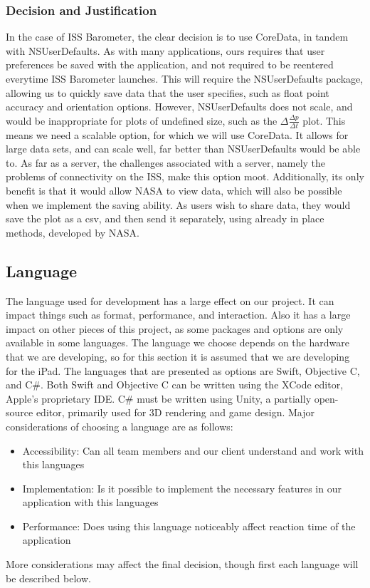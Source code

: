 \documentclass[onecolumn, draftclsnofoot,10pt, compsoc]{IEEEtran}
\begin{document}
\subsubsection{Decision and Justification}
In the case of ISS Barometer, the clear decision is to use CoreData, in tandem with NSUserDefaults.
As with many applications, ours requires that user preferences be saved with the application, and not required to be reentered everytime ISS Barometer launches.
This will require the NSUserDefaults package, allowing us to quickly save data that the user specifies, such as float point accuracy and orientation options.
However, NSUserDefaults does not scale, and would be inappropriate for plots of undefined size, such as the $\Delta \frac{\Delta p}{\Delta t}$ plot.
This means we need a scalable option, for which we will use CoreData.
It allows for large data sets, and can scale well, far better than NSUserDefaults would be able to.
As far as a server, the challenges associated with a server, namely the problems of connectivity on the ISS, make this option moot.
Additionally, its only benefit is that it would allow NASA to view data, which will also be possible when we implement the saving ability.
As users wish to share data, they would save the plot as a csv, and then send it separately, using already in place methods, developed by NASA.

\subsection{Language}
The language used for development has a large effect on our project.
It can impact things such as format, performance, and interaction.
Also it has a large impact on other pieces of this project, as some packages and options are only available in some languages.
The language we choose depends on the hardware that we are developing, so for this section it is assumed that we are developing for the iPad.
The languages that are presented as options are Swift, Objective C, and C\#.
Both Swift and Objective C can be written using the XCode editor, Apple's proprietary IDE.
C\# must be written using Unity, a partially open-source editor, primarily used for 3D rendering and game design.
Major considerations of choosing a language are as follows:
\begin{itemize}
	\item Accessibility: Can all team members and our client understand and work with this languages
	\item Implementation: Is it possible to implement the necessary features in our application with this languages
	\item Performance: Does using this language noticeably affect reaction time of the application
\end{itemize}
More considerations may affect the final decision, though first each language will be described below.
\end{document}
